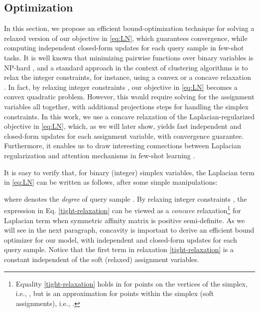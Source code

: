 \documentclass{article}
\begin{document}
\subsection{Optimization}
In this section, we propose an efficient bound-optimization technique for solving a relaxed version of our objective in \eqref{eq:LN}, which guarantees convergence, while computing independent closed-form updates for each query sample in few-shot tasks. It is well known that minimizing pairwise functions over binary variables is NP-hard \cite{Tian-AAAI}, and a standard approach in the context of clustering algorithms is to relax the integer constraints, for instance, using a convex \cite{WangCarreira-Perpinan2014} or a concave relaxation \cite{ziko2018scalable}. In fact, by relaxing integer constraints , our objective in \eqref{eq:LN} becomes a convex quadratic problem. However, this would require solving for the  assignment variables all together, with additional projections steps for handling the simplex constraints. In this work, we use a concave relaxation of the Laplacian-regularized objective in \eqref{eq:LN}, which, as we will later show, yields fast independent and closed-form updates for each assignment variable, with convergence guarantee. Furthermore, it enables us to draw interesting connections between Laplacian regularization and attention mechanisms in few-shot learning \cite{Vinyals2016MatchingNF}. 

It is easy to verify that, for binary (integer) simplex variables, the Laplacian term in \eqref{eq:LN} can be written as follows, after some simple manipulations: 
 
where  denotes the {\em degree} of query sample . 
By relaxing integer constraints , the expression in Eq. \eqref{tight-relaxation} can be viewed as a {\em concave} relaxation\footnote{Equality \eqref{tight-relaxation} holds in for points on the vertices of the simplex, i.e.,  
, but is an approximation for points within the simplex (soft assignments), i.e., .} for Laplacian term  when symmetric affinity matrix  is positive semi-definite. 
As we will see in the next paragraph, concavity is important to derive an efficient bound optimizer for our model, with independent and closed-form updates for each query sample. Notice that the first term in relaxation \eqref{tight-relaxation} is a constant independent of the soft (relaxed) assignment variables.  
\end{document}
